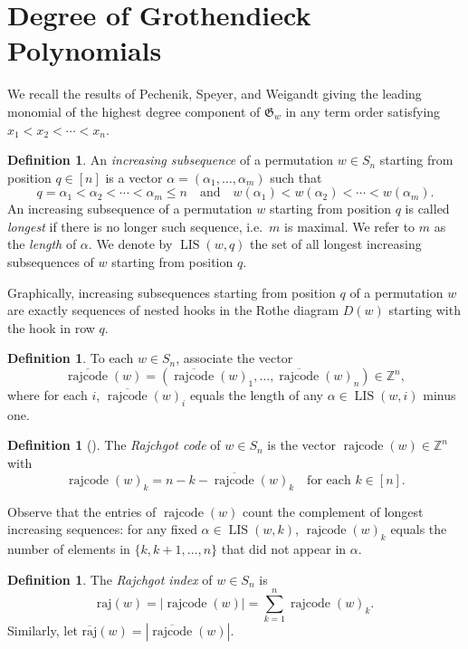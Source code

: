 \documentclass[11pt]{amsart}
\theoremstyle{definition}
\newtheorem{definition}[theorem]{Definition}
\theoremstyle{named}
\DeclareMathOperator{\rr}{\mathrm{rajcode}} %
\newcommand{\orr}{\overline{\rr}} %
\newcommand{\absrajcode}[1]{\mathrm{raj}(#1)}
\newcommand{\absoverrajcode}[1]{\overline{\mathrm{raj}}(#1)}
\DeclareMathOperator{\LIS}{\mathrm{LIS}}
\begin{document}
	\section{Degree of Grothendieck Polynomials}
	\label{sec:PSW}
	
	We recall the results of Pechenik, Speyer, and Weigandt \cite{PSW} giving the leading monomial of the highest degree component of $\mathfrak{G}_w$ in any term order satisfying $x_1< x_2<\cdots< x_n$.
	
	\begin{definition}\label{def:1}
		An \emph{increasing subsequence} of a permutation $w\in S_n$ starting from position $q\in [n]$ is a vector $\alpha=(\alpha_1,\ldots,\alpha_m)$ such that
		\[q=\alpha_1<\alpha_2<\cdots<\alpha_m\leq n \quad \mbox{and}\quad w(\alpha_1)<w(\alpha_2)<\cdots<w(\alpha_m).\] 
		An increasing subsequence of a permutation $w$ starting from position $q$ is called \emph{longest} if there is no longer such sequence, i.e.\ $m$ is maximal. We refer to $m$ as the \emph{length} of $\alpha$. We denote by $\LIS(w,q)$ the set of all longest increasing subsequences of $w$ starting from position $q$.
	\end{definition}
	
	Graphically, increasing subsequences starting from position $q$ of a permutation $w$ are exactly sequences of nested hooks in the Rothe diagram $D(w)$ starting with the hook in row $q$.
	
	\begin{definition}
		To each $w\in S_n$, associate the vector 
		\[\orr(w)=(\orr(w)_1,\ldots,\orr(w)_n)\in\mathbb{Z}^n,\]
		where for each $i$, $\orr(w)_i$ equals the length of any $\alpha\in \LIS(w,i)$ minus one. 
	\end{definition}
	
	\begin{definition}[{\cite{PSW}}]
		The \emph{Rajchgot code} of $w\in S_n$ is the vector $\rr(w)\in \mathbb{Z}^n$ with 
		\[\rr(w)_k = n-k - \orr(w)_k \quad\mbox{for each } k\in [n]. \]
	\end{definition}

	Observe that the entries of $\rr(w)$ count the complement of longest increasing sequences: for any fixed $\alpha\in\LIS(w,k)$, $\rr(w)_k$ equals the number of elements in $\{k,k+1,\ldots,n\}$ that did not appear in $\alpha$.
	
	\begin{definition}
		The \emph{Rajchgot index} of $w\in S_n$ is
		\[\absrajcode{w} = |\rr(w)| = \sum_{k=1}^n \rr(w)_k.\]
		Similarly, let $\absoverrajcode{w} = |\orr(w)|$.
	\end{definition}
\end{document}
